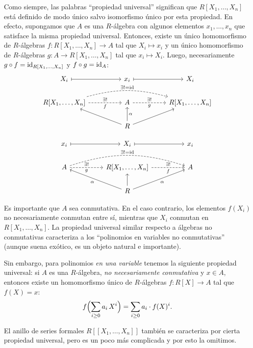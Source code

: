 Como siempre, las palabras ``propiedad universal'' significan
que $R [X_1,\ldots,X_n]$ está definido de modo único salvo isomorfismo único
por esta propiedad. En efecto, supongamos que $A$ es una $R$-álgebra con algunos
elementos $x_1,\ldots,x_n$ que satisface la misma propiedad universal. Entonces,
existe un único homomorfismo de $R$-álgebras $f\colon R [X_1,\ldots,X_n] \to A$
tal que $X_i \mapsto x_i$ y un único homomorfismo de $R$-álgebras
$g\colon A \to R [X_1,\ldots,X_n]$ tal que $x_i \mapsto X_i$. Luego,
necesariamente $g\circ f = \mathrm{id}_{R [X_1,\ldots,X_n]}$ y $f\circ g = \mathrm{id}_{A}$:
\[ \begin{tikzcd}
    X_i \ar[|->]{rr} && x_i \ar[|->]{rr} && X_i \\
    R [X_1,\ldots,X_n] \ar[dashed]{rr}{\exists !}[swap]{f} \ar[dashed,bend left=15]{rrrr}{\exists ! = \idid} &&
    A \ar[dashed]{rr}{\exists !}[swap]{g} && R [X_1,\ldots,X_n] \\
    & & R\ar{ull}\ar{u}[swap]{\alpha}\ar{urr}
\end{tikzcd} \]

\[ \begin{tikzcd}
    x_i \ar[|->]{rr} && X_i \ar[|->]{rr} && x_i \\
    A \ar[dashed]{rr}{\exists !}[swap]{g} \ar[dashed,bend left=18]{rrrr}{\exists ! = \idid} &&
    R [X_1,\ldots,X_n] \ar[dashed]{rr}{\exists !}[swap]{f} && A \\
    & & R\ar{ull}{\alpha}\ar{u}\ar{urr}[swap]{\alpha}
\end{tikzcd} \]

\begin{comentario}
  Es importante que $A$ sea conmutativa. En el caso contrario, los elementos
  $f (X_i)$ no necesariamente conmutan entre sí, mientras que $X_i$ conmutan
  en $R [X_1,\ldots,X_n]$. La propiedad universal similar respecto a álgebras
  no conmutativas caracteriza a los ``polinomios en variables no conmutativas''
  (aunque suena exótico, es un objeto natural e importante).

  Sin embargo, para polinomios \emph{en una variable} tenemos la siguiente
  propiedad universal: si $A$ es una $R$-álgebra, \emph{no necesariamente
    conmutativa} y $x\in A$, entonces existe un homomorfismo único
  de $R$-álgebras $f\colon R[X] \to A$ tal que $f (X) = x$:
  $$f \Bigl(\sum_{i\ge 0} a_i\,X^i\Bigr) = \sum_{i\ge 0} a_i\cdot f (X)^i.$$
\end{comentario}

\begin{comentario}
  \label{comentario:prop-univ-de-R[X]}
  El anillo de series formales $R [\![X_1,\ldots,X_n]\!]$ también se caracteriza
  por cierta propiedad universal, pero es un poco más complicada y por esto
  la omitimos.
\end{comentario}

